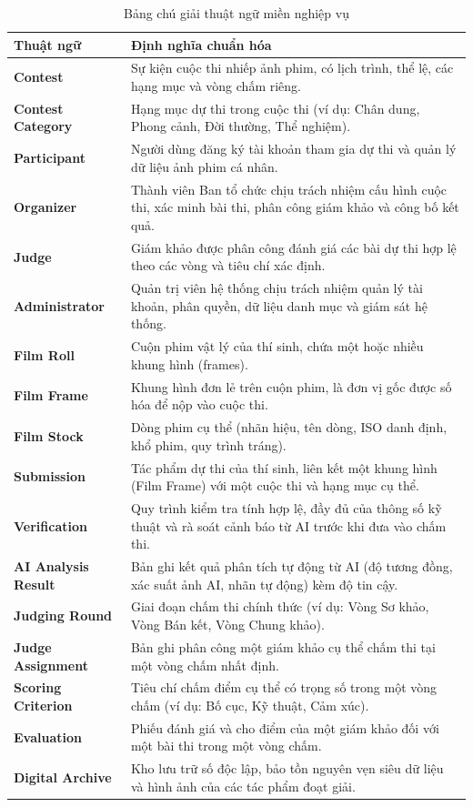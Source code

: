 \begin{table}[!ht]
\centering
\caption{Bảng chú giải thuật ngữ miền nghiệp vụ}
\label{tab:c1_glossary}
\footnotesize
\renewcommand{\arraystretch}{1.05}
\begin{tabularx}{\textwidth}{>{\bfseries}p{3.5cm}>{\raggedright\arraybackslash}X}
\toprule
\textbf{Thuật ngữ} & \textbf{Định nghĩa chuẩn hóa} \\
\midrule
Contest & Sự kiện cuộc thi nhiếp ảnh phim, có lịch trình, thể lệ, các hạng mục và vòng chấm riêng. \\
Contest Category & Hạng mục dự thi trong cuộc thi (ví dụ: Chân dung, Phong cảnh, Đời thường, Thể nghiệm). \\
Participant & Người dùng đăng ký tài khoản tham gia dự thi và quản lý dữ liệu ảnh phim cá nhân. \\
Organizer & Thành viên Ban tổ chức chịu trách nhiệm cấu hình cuộc thi, xác minh bài thi, phân công giám khảo và công bố kết quả. \\
Judge & Giám khảo được phân công đánh giá các bài dự thi hợp lệ theo các vòng và tiêu chí xác định. \\
Administrator & Quản trị viên hệ thống chịu trách nhiệm quản lý tài khoản, phân quyền, dữ liệu danh mục và giám sát hệ thống. \\
Film Roll & Cuộn phim vật lý của thí sinh, chứa một hoặc nhiều khung hình (frames). \\
Film Frame & Khung hình đơn lẻ trên cuộn phim, là đơn vị gốc được số hóa để nộp vào cuộc thi. \\
Film Stock & Dòng phim cụ thể (nhãn hiệu, tên dòng, ISO danh định, khổ phim, quy trình tráng). \\
Submission & Tác phẩm dự thi của thí sinh, liên kết một khung hình (Film Frame) với một cuộc thi và hạng mục cụ thể. \\
Verification & Quy trình kiểm tra tính hợp lệ, đầy đủ của thông số kỹ thuật và rà soát cảnh báo từ AI trước khi đưa vào chấm thi. \\
AI Analysis Result & Bản ghi kết quả phân tích tự động từ AI (độ tương đồng, xác suất ảnh AI, nhãn tự động) kèm độ tin cậy. \\
Judging Round & Giai đoạn chấm thi chính thức (ví dụ: Vòng Sơ khảo, Vòng Bán kết, Vòng Chung khảo). \\
Judge Assignment & Bản ghi phân công một giám khảo cụ thể chấm thi tại một vòng chấm nhất định. \\
Scoring Criterion & Tiêu chí chấm điểm cụ thể có trọng số trong một vòng chấm (ví dụ: Bố cục, Kỹ thuật, Cảm xúc). \\
Evaluation & Phiếu đánh giá và cho điểm của một giám khảo đối với một bài thi trong một vòng chấm. \\
Digital Archive & Kho lưu trữ số độc lập, bảo tồn nguyên vẹn siêu dữ liệu và hình ảnh của các tác phẩm đoạt giải. \\
\bottomrule
\end{tabularx}
\end{table}

